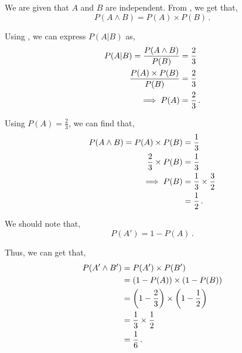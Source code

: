 \begin{subquestions}
\subquestion

\begin{subsubquestions}
	
\subsubquestion
	
We are given that $A$ and $B$ are independent. From , we get that,
\begin{equation}
	P(A \land B) = P (A) \times P(B) \,.
\end{equation}

Using , we can express $P(A|B)$ as,
\begin{align}
	P(A|B) = \frac{P(A \land B)}{P(B)} & = \frac{2}{3} \nonumber \\
	         \frac{P(A) \times P(B)}{P(B)} & = \frac{2}{3} \nonumber \\
	         \implies P(A) & = \frac{2}{3} \,.
\end{align}
	

\subsubquestion

Using $P(A)=\frac{2}{3}$, we can find that,
\begin{align}
	P(A \land B) = P (A) \times P(B) & = \frac{1}{3} \nonumber \\
	                \frac{2}{3} \times P(B) & = \frac{1}{3} \nonumber \\
	                \implies P(B) & = \frac{1}{3} \times \frac{3}{2} \nonumber \\
	                              & = \frac{1}{2} \,.
\end{align}


\subsubquestion

We should note that,
\begin{equation}
	P(A') = 1 - P(A) \,.
\end{equation}

Thus, we can get that,
\begin{align}
	P(A' \land B') & = P(A') \times P(B') \nonumber \\
	               & = (1-P(A)) \times (1-P(B)) \nonumber \\
	               & = \left(1 - \frac{2}{3}\right) \times \left(1 - \frac{1}{2}\right) \nonumber \\
	               & = \frac{1}{3} \times \frac{1}{2} \nonumber \\
	               & = \frac{1}{6} \,.
\end{align}


\end{subsubquestions}
\end{subquestions}
